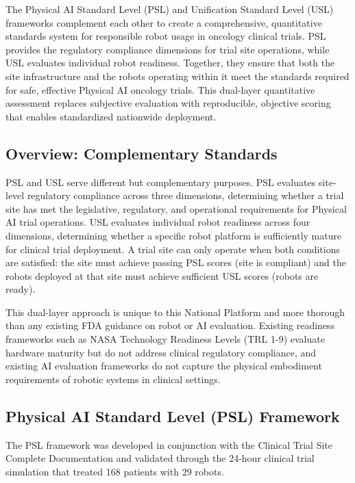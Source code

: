 
The Physical AI Standard Level (PSL) and Unification Standard Level (USL)
frameworks complement each other to create a comprehensive, quantitative
standards system for responsible robot usage in oncology clinical trials. PSL
provides the regulatory compliance dimensions for trial site operations, while
USL evaluates individual robot readiness. Together, they ensure that both the
site infrastructure and the robots operating within it meet the standards
required for safe, effective Physical AI oncology trials. This dual-layer
quantitative assessment replaces subjective evaluation with reproducible,
objective scoring that enables standardized nationwide deployment.

\subsection{Overview: Complementary Standards}
\label{subsec:standards-overview}

PSL and USL serve different but complementary purposes. PSL evaluates
site-level regulatory compliance across three dimensions, determining whether a
trial site has met the legislative, regulatory, and operational requirements
for Physical AI trial operations. USL evaluates individual robot readiness
across four dimensions, determining whether a specific robot platform is
sufficiently mature for clinical trial deployment. A trial site can only
operate when both conditions are satisfied: the site must achieve passing PSL
scores (site is compliant) and the robots deployed at that site must achieve
sufficient USL scores (robots are ready).

This dual-layer approach is unique to this National Platform and more thorough
than any existing FDA guidance on robot or AI evaluation. Existing readiness
frameworks such as NASA Technology Readiness Levels (TRL 1-9) evaluate hardware
maturity but do not address clinical regulatory compliance, and existing AI
evaluation frameworks do not capture the physical embodiment requirements of
robotic systems in clinical settings.

\subsection{Physical AI Standard Level (PSL) Framework}
\label{subsec:psl-framework}

The PSL framework was developed in conjunction with the Clinical Trial Site
Complete Documentation \cite{site-docs} and validated through the 24-hour
clinical trial simulation that treated 168 patients with 29 robots.

